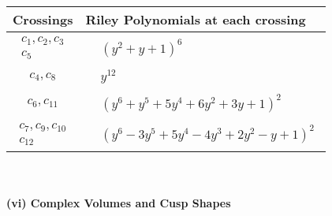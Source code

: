 \documentclass[1p]{elsarticle_modified}
\theoremstyle{definition}
\begin{document}
\begin{tabular}{m{50pt}|m{274pt}}
Crossings & \hspace{64pt}Riley Polynomials at each crossing \\
\hline $$\begin{aligned}c_{1},c_{2},c_{3}\\c_{5}\end{aligned}$$&$\begin{aligned}
&(y^2+y+1)^6
\end{aligned}$\\
\hline $$\begin{aligned}c_{4},c_{8}\end{aligned}$$&$\begin{aligned}
&y^{12}
\end{aligned}$\\
\hline $$\begin{aligned}c_{6},c_{11}\end{aligned}$$&$\begin{aligned}
&(y^6+y^5+5 y^4+6 y^2+3 y+1)^2
\end{aligned}$\\
\hline $$\begin{aligned}c_{7},c_{9},c_{10}\\c_{12}\end{aligned}$$&$\begin{aligned}
&(y^6-3 y^5+5 y^4-4 y^3+2 y^2- y+1)^2
\end{aligned}$\\
\hline
\end{tabular}\\~\\
\newpage\flushleft \textbf{(vi) Complex Volumes and Cusp Shapes}
\end{document}
